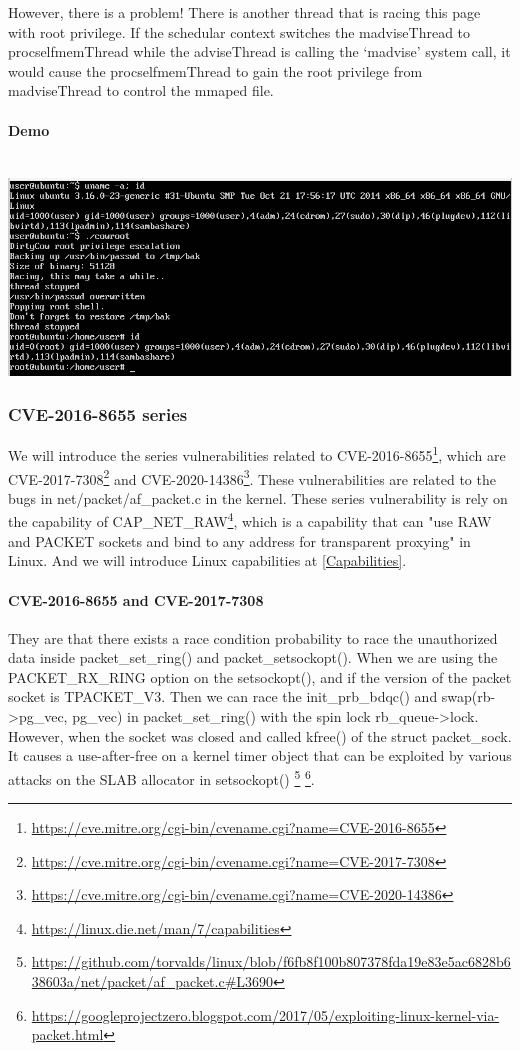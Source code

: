 However, there is a problem! There is another thread that is racing this page with root
privilege. If the schedular context switches the madviseThread to procselfmemThread while
the adviseThread is calling the `madvise' system call, it would cause the
procselfmemThread to gain the root privilege from madviseThread to control the mmaped file.

\paragraph{Demo}\mbox{}\\
\includegraphics[width=\textwidth]{src/Screenshot_2021-12-26_05-14-58.png}

\subsubsection{CVE-2016-8655 series}
We will introduce the series vulnerabilities related to CVE-2016-8655\footnote{
    \url{https://cve.mitre.org/cgi-bin/cvename.cgi?name=CVE-2016-8655}}, which are
CVE-2017-7308\footnote{\url{https://cve.mitre.org/cgi-bin/cvename.cgi?name=CVE-2017-7308}}
and CVE-2020-14386\footnote{\url{https://cve.mitre.org/cgi-bin/cvename.cgi?name=CVE-2020-14386}}.
These vulnerabilities are related to the bugs in net/packet/af\_packet.c in the kernel.
These series vulnerability is rely on the capability of CAP\_NET\_RAW\footnote{\url{https://linux.die.net/man/7/capabilities}},
which is a capability that can "use RAW and PACKET sockets and bind to
any address for transparent proxying" in Linux. And we will introduce Linux
capabilities at \ref{Capabilities}.

\paragraph{CVE-2016-8655 and CVE-2017-7308} They are that there exists a race condition probability to
race the unauthorized data inside packet\_set\_ring() and packet\_setsockopt().
When we are using the PACKET\_RX\_RING option on the setsockopt(), and if the
version of the packet socket is TPACKET\_V3. Then we can race the init\_prb\_bdqc()
and swap(rb->pg\_vec, pg\_vec) in packet\_set\_ring() with the spin lock rb\_queue->lock.
However, when the socket was closed and called kfree() of the struct packet\_sock.
It causes a use-after-free on a kernel timer object that can be exploited
by various attacks on the SLAB allocator in setsockopt()
\footnote{\url{https://github.com/torvalds/linux/blob/f6fb8f100b807378fda19e83e5ac6828b638603a/net/packet/af\_packet.c\#L3690}}
\footnote{\url{https://googleprojectzero.blogspot.com/2017/05/exploiting-linux-kernel-via-packet.html}}.

